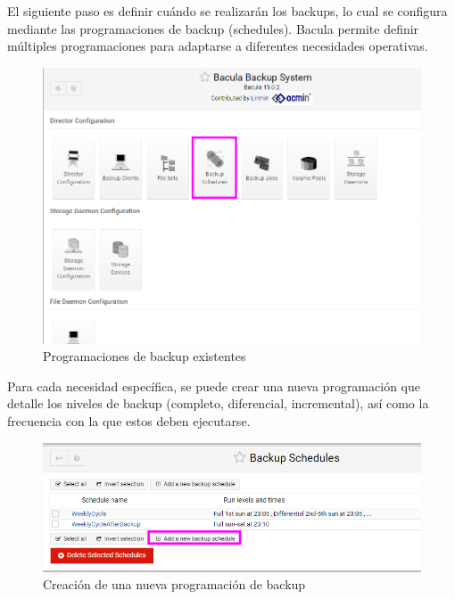 \begin{minipage}[t]{0.45\textwidth}
    \vspace{0pt} %
    El siguiente paso es definir cuándo se realizarán los backups, lo cual se configura mediante las programaciones de backup (schedules). Bacula permite definir múltiples programaciones para adaptarse a diferentes necesidades operativas.
   

    \end{minipage}%
    \hfill %
    \begin{minipage}[t]{0.45\textwidth}
    \vspace{0pt} %
    \centering %
      
    

    \begin{figure}[H]
        \centering
        \includegraphics[width=0.95\linewidth]{instalacionBacula/schedule.png}
        \caption{Programaciones de backup existentes}
    \end{figure}
    \end{minipage}


\smallskip





Para cada necesidad específica, se puede crear una nueva programación que detalle los niveles de backup (completo, diferencial, incremental), así como la frecuencia con la que estos deben ejecutarse.

\begin{figure}[H]
    \centering
    \includegraphics[width=0.5\linewidth]{instalacionBacula/newBackupSchedules.png}
    \caption{Creación de una nueva programación de backup}
\end{figure}

